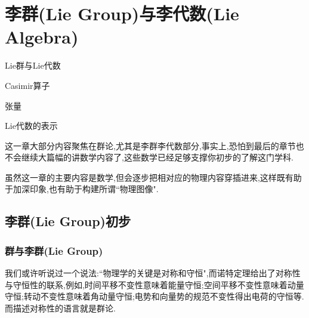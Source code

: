 \ifx\allfiles\undefined



	\else
	\fi
\chapter{李群(Lie Group)与李代数(Lie Algebra)}
\begin{introduction}
	\item Lie群与Lie代数
	\item Casimir算子
	\item 张量
	\item Lie代数的表示
\end{introduction}
这一章大部分内容聚焦在群论,尤其是李群李代数部分,事实上,恐怕到最后的章节也不会继续大篇幅的讲数学内容了,这些数学已经足够支撑你初步的了解这门学科.

虽然这一章的主要内容是数学,但会逐步把相对应的物理内容穿插进来,这样既有助于加深印象,也有助于构建所谓``物理图像".
\section{李群(Lie Group)初步}
\subsection{群与李群(Lie Group)}
我们或许听说过一个说法:``物理学的关键是对称和守恒",而诺特定理给出了对称性与守恒性的联系,例如,时间平移不变性意味着能量守恒;空间平移不变性意味着动量守恒;转动不变性意味着角动量守恒;电势和向量势的规范不变性得出电荷的守恒等.而描述对称性的语言就是群论.

